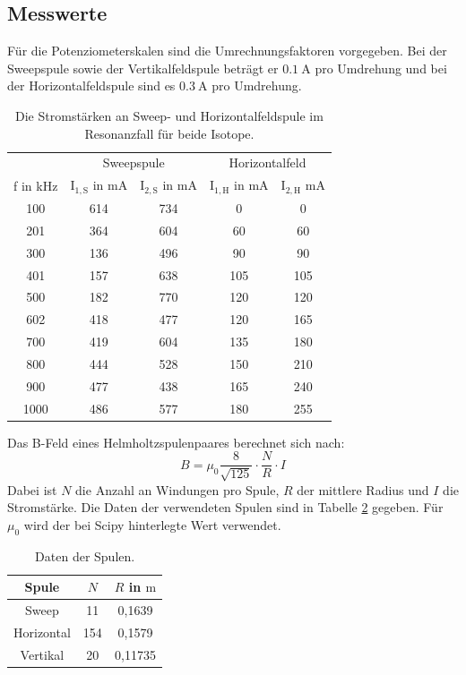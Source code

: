 \documentclass[
  bibliography=totoc,     %
  captions=tableheading,  %
  titlepage=firstiscover, %
]{scrartcl}
\begin{document}
\subsection{Messwerte}
Für die Potenziometerskalen sind die Umrechnungsfaktoren vorgegeben.
Bei der Sweepspule sowie der Vertikalfeldspule beträgt er $\SI{0.1}{\ampere}$ pro Umdrehung und bei
der Horizontalfeldspule sind es $\SI{0.3}{\ampere}$ pro Umdrehung.
\begin{table}[H]
  \centering
  \caption{Die Stromstärken an Sweep- und Horizontalfeldspule im Resonanzfall für beide Isotope.}
  \label{tab:1}
  \begin{tabular}{c c c c c}
    \toprule
    & \multicolumn{2}{c}{Sweepspule} & \multicolumn{2}{c}{Horizontalfeld}\\
    f in \si{\kilo\hertz} & $\mathup{I_{1,S}}$ in $\si{\milli\ampere}$ & $\mathup{I_{2,S}}$ in $\si{\milli\ampere}$ & $\mathup{I_{1,H}}$ in $\si{\milli\ampere}$ & $\mathup{I_{2,H}}$ $\si{\milli\ampere}$ \\
    \midrule
    100  & 614 & 734 &   0 &   0 \\
    201  & 364 & 604 &  60 &  60 \\
    300  & 136 & 496 &  90 &  90 \\
    401  & 157 & 638 & 105 & 105 \\
    500  & 182 & 770 & 120 & 120 \\
    602  & 418 & 477 & 120 & 165 \\
    700  & 419 & 604 & 135 & 180 \\
    800  & 444 & 528 & 150 & 210 \\
    900  & 477 & 438 & 165 & 240 \\
    1000 & 486 & 577 & 180 & 255 \\
    \bottomrule
  \end{tabular}
\end{table}
Das B-Feld eines Helmholtzspulenpaares berechnet sich nach:
\begin{equation}
  B = \mu_0 \frac{8}{\sqrt{125}}\cdot \frac{N}{R} \cdot I
\end{equation}
Dabei ist $N$ die Anzahl an Windungen pro Spule, $R$ der mittlere Radius
und $I$ die Stromstärke. Die Daten der verwendeten Spulen sind in Tabelle \ref{tab:2}
gegeben. Für $\mu_0$ wird der bei Scipy \cite{scipy} hinterlegte Wert verwendet.
\begin{table}[H]
  \centering
  \caption{Daten der Spulen.}
  \label{tab:2}
  \begin{tabular}{c c c}
    \toprule
    Spule & $N$ & $R$ in $\si{\meter}$ \\
    \midrule
    Sweep       &  11 & 0,1639 \\
    Horizontal  & 154 & 0,1579 \\
    Vertikal    &  20 & 0,11735 \\
    \bottomrule
  \end{tabular}
\end{table}
\end{document}
